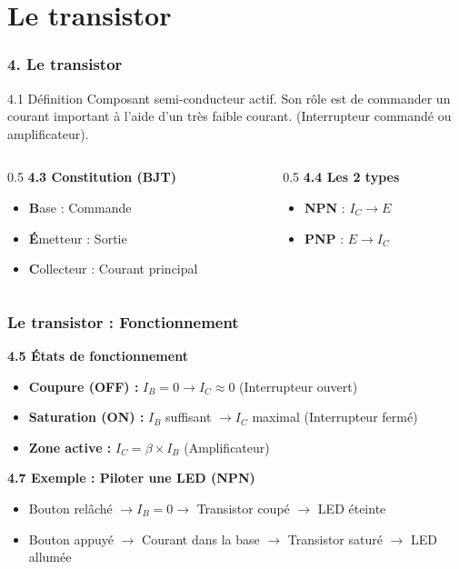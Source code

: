 \documentclass[11pt]{beamer}
\begin{document}
\section{Le transistor}
\begin{frame}
    \frametitle{4. Le transistor}
    \begin{block}{4.1 Définition}
        Composant semi-conducteur actif. Son rôle est de commander un courant important à l'aide d'un très faible courant. (Interrupteur commandé ou amplificateur).
    \end{block}
    
    \begin{columns}[t]
        \begin{column}{0.5\textwidth}
            \textbf{4.3 Constitution (BJT)}
            \begin{itemize}
                \item \textbf{B}ase : Commande
                \item \textbf{É}metteur : Sortie
                \item \textbf{C}ollecteur : Courant principal
            \end{itemize}
        \end{column}
        \begin{column}{0.5\textwidth}
            \textbf{4.4 Les 2 types}
            \begin{itemize}
                \item \textbf{NPN} : $I_C \to E$
                \item \textbf{PNP} : $E \to I_C$
            \end{itemize}
        \end{column}
    \end{columns}
\end{frame}

\begin{frame}
    \frametitle{Le transistor : Fonctionnement}
    \textbf{4.5 États de fonctionnement}
    \begin{itemize}
        \item \textbf{Coupure (OFF) :} $I_B = 0 \rightarrow I_C \approx 0$ (Interrupteur ouvert)
        \item \textbf{Saturation (ON) :} $I_B$ suffisant $\rightarrow I_C$ maximal (Interrupteur fermé)
        \item \textbf{Zone active :} $I_C = \beta \times I_B$ (Amplificateur)
    \end{itemize}
    
    \vspace{0.5cm}
    \textbf{4.7 Exemple : Piloter une LED (NPN)}
    \begin{itemize}
        \item Bouton relâché $\rightarrow I_B = 0 \rightarrow$ Transistor coupé $\rightarrow$ LED éteinte
        \item Bouton appuyé $\rightarrow$ Courant dans la base $\rightarrow$ Transistor saturé $\rightarrow$ LED allumée
    \end{itemize}
\end{frame}
\end{document}
